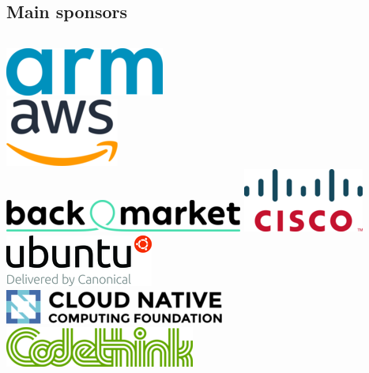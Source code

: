 \documentclass[aspectratio=169]{beamer}
\begin{document}
\subsection{Main sponsors}

\begin{frame}
	\begin{columns}[t]
	\centering
		\includegraphics[scale=0.5]{images/arm.png}\\
		\vspace{0.5cm}
		\includegraphics[scale=0.5]{images/aws.png}\\
		\vspace{0.5cm}
		\includegraphics[scale=0.3]{images/backmarket.png}
	\centering
		\includegraphics[scale=0.5]{images/cisco.png}\\
		\vspace{0.4cm}
		\includegraphics[scale=0.5]{images/canonical.png}\\
		\vspace{0.4cm}
		\includegraphics[scale=0.4]{images/cncf.png}\\
		\vspace{0.4cm}
		\includegraphics[scale=0.5]{images/codethink.png}

\end{columns}
\end{frame}
\end{document}
